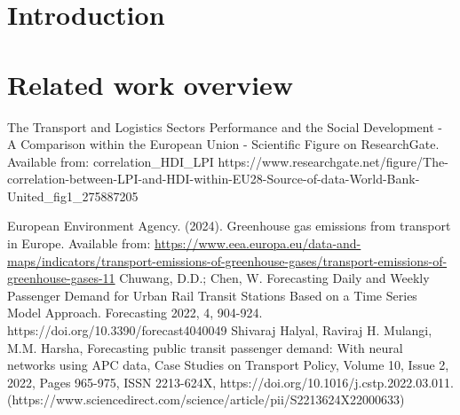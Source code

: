 \documentclass[a4paper,12pt,fleqn]{article}
\begin{document}

\tableofcontents











\newpage
\section{Introduction}
\label{sec:intro}


\newpage
\section{Related work overview}




\newpage
\begin{thebibliography}{99}
        The Transport and Logistics Sector\’s Performance and the Social Development - A Comparison within the European Union - Scientific Figure on ResearchGate. Available from: correlation\_HDI\_LPI https://www.researchgate.net/figure/The-correlation-between-LPI-and-HDI-within-EU28-Source-of-data-World-Bank-United\_fig1\_275887205

        European Environment Agency. (2024). Greenhouse gas emissions from transport in Europe. Available from: \url{https://www.eea.europa.eu/data-and-maps/indicators/transport-emissions-of-greenhouse-gases/transport-emissions-of-greenhouse-gases-11}
        Chuwang, D.D.; Chen, W. Forecasting Daily and Weekly Passenger Demand for Urban Rail Transit Stations Based on a Time Series Model Approach. Forecasting 2022, 4, 904-924. https://doi.org/10.3390/forecast4040049
         Shivaraj Halyal, Raviraj H. Mulangi, M.M. Harsha,
        Forecasting public transit passenger demand: With neural networks using APC data,
        Case Studies on Transport Policy,
        Volume 10, Issue 2,
        2022,
        Pages 965-975,
        ISSN 2213-624X,
        https://doi.org/10.1016/j.cstp.2022.03.011.
        (https://www.sciencedirect.com/science/article/pii/S2213624X22000633)
\end{thebibliography}
\end{document}
